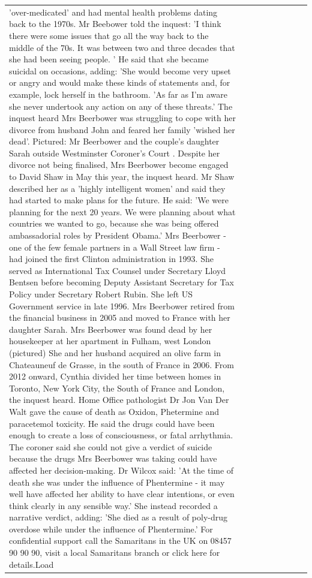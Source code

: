 \begin{table}[H]
\begin{tabular}{lllrlllll}
'over-medicated' and had mental health problems dating back to the 1970s. Mr Beebower told the inquest: 'I think there were some issues that go all the way back to the middle of the 70s. It was between two and three decades that she had been seeing people. ' He said that she became suicidal on occasions, adding: 'She would become very upset or angry and would make these kinds of statements and, for example, lock herself in the bathroom. 'As far as I'm aware she never undertook any action on any of these threats.' The inquest heard Mrs Beerbower was struggling to cope with her divorce from husband John and feared her family 'wished her dead'. Pictured: Mr Beerbower and the couple's daughter Sarah outside Westminster Coroner's Court . Despite her divorce not being finalised, Mrs Beerbower become engaged to David Shaw in May this year, the inquest heard. Mr Shaw described her as a 'highly intelligent women' and said they had started to make plans for the future. He said: 'We were planning for the next 20 years. We were planning about what countries we wanted to go, because she was being offered ambassadorial roles by President Obama.' Mrs Beerbower - one of the few female partners in a Wall Street law firm - had joined the first Clinton administration in 1993. She served as International Tax Counsel under Secretary Lloyd Bentsen before becoming Deputy Assistant Secretary for Tax Policy under Secretary Robert Rubin. She left US Government service in late 1996. Mrs Beerbower retired from the financial business in 2005 and moved to France with her daughter Sarah. Mrs Beerbower was found dead by her housekeeper at her apartment in Fulham, west London (pictured) She and her husband acquired an olive farm in Chateauneuf de Grasse, in the south of France in 2006. From 2012 onward, Cynthia divided her time between homes in Toronto, New York City, the South of France and London, the inquest heard. Home Office pathologist Dr Jon Van Der Walt gave the cause of death as Oxidon, Phetermine and paracetemol toxicity. He said the drugs could have been enough to create a loss of consciousness, or fatal arrhythmia. The coroner said she could not give a verdict of suicide because the drugs Mrs Beerbower was taking could have affected her decision-making. Dr Wilcox said: 'At the time of death she was under the influence of Phentermine - it may well have affected her ability to have clear intentions, or even think clearly in any sensible way.' She instead recorded a narrative verdict, adding: 'She died as a result of poly-drug overdose while under the influence of Phentermine.' For confidential support call the Samaritans in the UK on 08457 90 90 90, visit a local Samaritans branch or click here for details.Load \\

\end{tabular}
\end{table}
